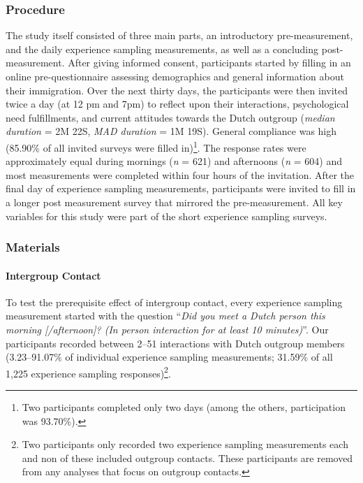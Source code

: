 \subsubsection{Procedure}

The study itself consisted of three main parts, an introductory
pre-measurement, and the daily experience sampling measurements, as well
as a concluding post-measurement. After giving informed consent,
participants started by filling in an online pre-questionnaire assessing
demographics and general information about their immigration. Over the
next thirty days, the participants were then invited twice a day (at 12
pm and 7pm) to reflect upon their interactions, psychological need
fulfillments, and current attitudes towards the Dutch outgroup
(\textit{median duration} = 2M 22S, \textit{MAD duration} = 1M 19S).
General compliance was high (85.90\% of all invited surveys were filled
in)\footnote{Two participants completed only two days (among the others, participation was 93.70\%).}.
The response rates were approximately equal during mornings (\textit{n}
= 621) and afternoons (\textit{n} = 604) and most measurements were
completed within four hours of the invitation. After the final day of
experience sampling measurements, participants were invited to fill in a
longer post measurement survey that mirrored the pre-measurement. All
key variables for this study were part of the short experience sampling
surveys.

\subsubsection{Materials}

\paragraph{Intergroup Contact}

To test the prerequisite effect of intergroup contact, every experience
sampling measurement started with the question
``\textit{Did you meet a Dutch person this morning [/afternoon]? (In person interaction for at least 10 minutes)}''.
Our participants recorded between 2--51 interactions with Dutch outgroup
members (3.23--91.07\% of individual experience sampling measurements;
31.59\% of all 1,225 experience sampling
responses)\footnote{Two participants only recorded two experience sampling measurements each and non of these included outgroup contacts. These participants are removed from any analyses that focus on outgroup contacts.}.

